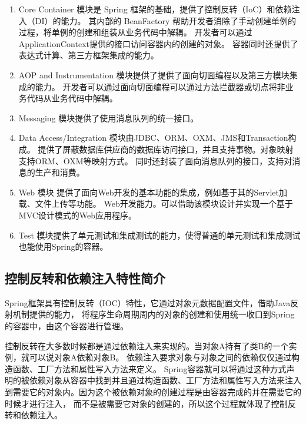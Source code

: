 \begin{enumerate}
    \item Core Container 模块是 Spring 框架的基础，提供了控制反转（IoC）和依赖注入（DI）的能力。
    其内部的 BeanFactory 帮助开发者消除了手动创建单例的过程，将单例的创建和组装从业务代码中解耦。
    开发者可以通过ApplicationContext提供的接口访问容器内的创建的对象。
    容器同时还提供了表达式计算、第三方框架集成的能力。
    \item AOP and Instrumentation 模块提供了提供了面向切面编程以及第三方模块集成的能力。
    开发者可以通过面向切面编程可以通过方法拦截器或切点将非业务代码从业务代码中解耦。
    \item Messaging 模块提供了使用消息队列的统一接口。
    \item Data Access/Integration 模块由JDBC、ORM、OXM、JMS和Transaction构成。
    提供了屏蔽数据库供应商的数据库访问接口，并且支持事物。对象映射支持ORM、OXM等映射方式。
    同时还封装了面向消息队列的接口，支持对消息的生产和消费。
    \item Web 模块 提供了面向Web开发的基本功能的集成，例如基于其的Servlet加载、文件上传等功能。
    Web开发能力。可以借助该模块设计并实现一个基于MVC设计模式的Web应用程序。
    \item Test 模块提供了单元测试和集成测试的能力，使得普通的单元测试和集成测试也能使用Spring的容器。
\end{enumerate}

\subsection{控制反转和依赖注入特性简介}
Spring框架具有控制反转（IOC）特性，它通过对象元数据配置文件，借助Java反射机制提供的能力，
将程序生命周期周内的对象的创建和使用统一收口到Spring的容器中，由这个容器进行管理。

控制反转在大多数时候都是通过依赖注入来实现的。当对象A持有了类B的一个实例，就可以说对象A依赖对象B。
依赖注入要求对象与对象之间的依赖仅仅通过构造函数、工厂方法和属性写入方法来定义。
Spring容器就可以将通过这种方式声明的被依赖对象从容器中找到并且通过构造函数、工厂方法和属性写入方法来注入
到需要它的对象内。因为这个被依赖对象的创建过程是由容器完成的并在需要它的时候才进行注入，
而不是被需要它对象的创建的，所以这个过程就体现了控制反转和依赖注入。


